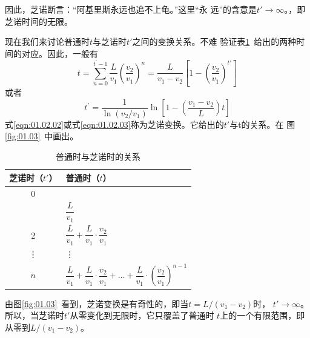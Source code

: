 因此，芝诺断言：“阿基里斯永远也追不上龟。”这里“永
远”的含意是$t'\rightarrow\infty$。，即芝诺时间的无限。

现在我们来讨论普通时$t$与芝诺时$t'$之间的变换关系。不难
验证表\ref{tab:01.02}~给出的两种时间的对应。因此，一般有
{\setlength{\mathindent}{5em}
\begin{equation}
    t=\sum_{n=0}^{t^{\prime}-1} \frac{L}{v_{1}}\left(\frac{v_{2}}{v_{1}}\right)^{n}=\frac{L}{v_{1}-v_{2}}\left[1-\left(\frac{v_{2}}{v_{1}}\right)^{t'}\right]
    \label{eqn:01.02.02}
\end{equation}}%
或者\vspace{-1.2em}
\begin{equation}
    t^{\prime}=\frac{1}{\ln \left(v_{2} / v_{1}\right)} \ln \left[1-\left(\frac{v_{1}-v_{2}}{L}\right) t\right]
    \label{eqn:01.02.03}
\end{equation}%
式\eqref{eqn:01.02.02}或式\eqref{eqn:01.02.03}称为芝诺变换。它给出的$t'$与t的关系。在
图\ref{fig:01.03}~中画出。

\begin{table}[!h]
    \centering
    \vspace{-0.5em}
    \caption{普通时与芝诺时的关系}
    \label{tab:01.02}
    \begin{tabular}{c|l}
        \toprule
        芝诺时（$t'$） & \hspace{7em}普通时（$t$）                                                                                                         \\
        \midrule
        0              & \qquad 0                                                                                                                          \\
        \addlinespace
        1              & \qquad $\dfrac{L}{v_1}$                                                                                                           \\
        \addlinespace
        2              & \qquad $\dfrac{L}{v_1} + \dfrac{L}{v_1}\cdot\dfrac{v_2}{v_1}$                                                                     \\
        \addlinespace
        \vdots         & \qquad \vdots                                                                                                                     \\
        \addlinespace
        $n$            & \qquad $\dfrac{L}{v_1} + \dfrac{L}{v_1}\cdot\dfrac{v_2}{v_1} + \dots + \dfrac{L}{v_1}\cdot(\dfrac{v_2}{v_1})^{n-1} $ \qquad \null \\
        \bottomrule
    \end{tabular}
    \vspace{-1.2em}
\end{table}
由图\ref{fig:01.03}~看到，芝诺变换是有奇性的，即当$t=L/(v_1-v_2)$时，
$t'\rightarrow\infty$。所以，当芝诺时$t'$从零变化到无限时，它只覆盖了普通时
$t$上的一个有限范围，即从零到$ L/(v_1-v_2) $。

